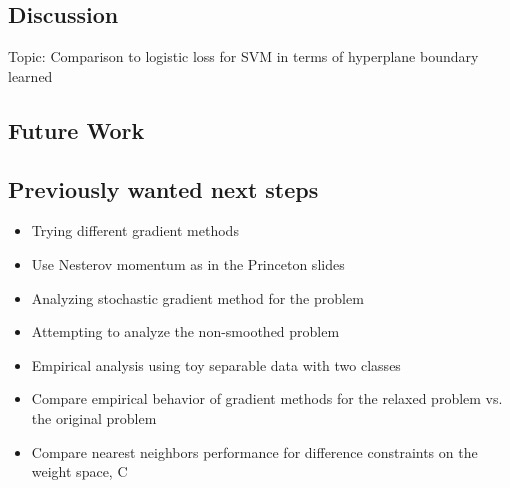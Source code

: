 \documentclass[11pt]{article}
\begin{document}
\subsection{Discussion}

Topic: Comparison to logistic loss for SVM in terms of hyperplane boundary learned

\subsection{Future Work}

\subsection{Previously wanted next steps}

\begin{itemize}
  \item Trying different gradient methods
  \item Use Nesterov momentum as in the Princeton slides
  \item Analyzing stochastic gradient method for the problem
  \item Attempting to analyze the non-smoothed problem
  \item Empirical analysis using toy separable data with two classes
  \item Compare empirical behavior of gradient methods for the relaxed problem vs. the original problem
  \item Compare nearest neighbors performance for difference constraints on the weight space, C
\end{itemize}


\end{document}
